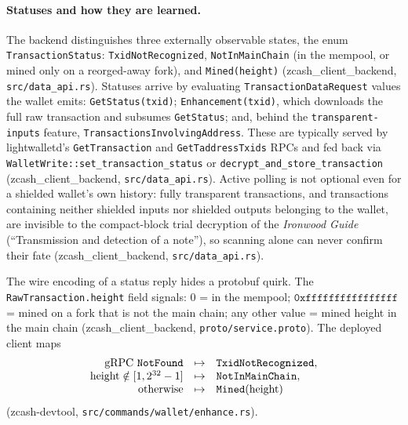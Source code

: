 \documentclass[11pt,a4paper]{article}
\theoremstyle{definition}
\begin{document}
\paragraph{Statuses and how they are learned.} The backend distinguishes
three externally observable states, the enum \texttt{TransactionStatus}:
\texttt{TxidNotRecognized}, \texttt{NotInMainChain} (in the mempool, or
mined only on a reorged-away fork), and \texttt{Mined(height)}
(\textsf{zcash\_client\_backend}, \texttt{src/data\_api.rs}). Statuses
arrive by evaluating \texttt{TransactionDataRequest} values the wallet
emits: \texttt{GetStatus(txid)}; \texttt{Enhancement(txid)}, which
downloads the full raw transaction and subsumes \texttt{GetStatus}; and,
behind the \texttt{transparent-inputs} feature,
\texttt{TransactionsInvolvingAddress}. These are typically served by
lightwalletd's \texttt{GetTransaction} and \texttt{GetTaddressTxids} RPCs
and fed back via \texttt{WalletWrite::set\_transaction\_status} or
\texttt{decrypt\_and\_store\_transaction}
(\textsf{zcash\_client\_backend}, \texttt{src/data\_api.rs}). Active
polling is not optional even for a shielded wallet's own history: fully
transparent transactions, and transactions containing neither shielded
inputs nor shielded outputs belonging to the wallet, are invisible to the
compact-block trial decryption of the \emph{Ironwood Guide} (``Transmission
and detection of a note''), so scanning alone can never confirm their fate
(\textsf{zcash\_client\_backend}, \texttt{src/data\_api.rs}).

The wire encoding of a status reply hides a protobuf quirk. The
\texttt{RawTransaction.height} field signals: $0$ = in the mempool;
$\mathtt{0xffffffffffffffff}$ = mined on a fork that is not the main chain;
any other value = mined height in the main chain
(\textsf{zcash\_client\_backend}, \texttt{proto/service.proto}). The
deployed client maps
\[
\begin{array}{rcl}
\text{gRPC \texttt{NotFound}} &\mapsto& \texttt{TxidNotRecognized},\\
\mathrm{height} \notin [1, 2^{32}-1] &\mapsto& \texttt{NotInMainChain},\\
\text{otherwise} &\mapsto& \texttt{Mined}(\mathrm{height})
\end{array}
\]
(\textsf{zcash-devtool}, \texttt{src/commands/wallet/enhance.rs}).
\end{document}
